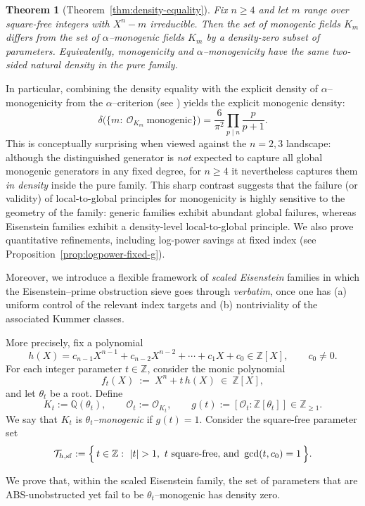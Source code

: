 \documentclass[11pt,letterpaper]{amsart}
\newcommand{\Z}{\mathbb{Z}}
\newcommand{\Q}{\mathbb{Q}}
\newcommand{\Ocal}{\mathcal{O}}
\theoremstyle{plain}
\newtheorem{theorem}{Theorem}[section]
\theoremstyle{definition}
\theoremstyle{remark}
\theoremstyle{plain}
\begin{document}
\begin{theorem}[Theorem~\ref{thm:density-equality}]
\label{thm:intro-density-equality}
Fix $n\ge4$ and let $m$ range over square-free integers with $X^n-m$ irreducible.
Then the set of monogenic fields $K_m$ differs from the set of $\alpha$--monogenic fields $K_m$ by a density-zero subset of parameters. Equivalently, monogenicity and $\alpha$--monogenicity have the same two-sided natural density in the pure family.
\end{theorem}

In particular, combining the density equality with the explicit density of $\alpha$--monogenicity from the $\alpha$--criterion (see \cite{NDN25}) yields the explicit monogenic density:
\[
\delta\bigl(\{m:\ \Ocal_{K_m}\ \text{monogenic}\}\bigr)
=
\frac{6}{\pi^2}\prod_{p\mid n}\frac{p}{p+1}.
\]
This is conceptually surprising when viewed against the $n=2,3$ landscape: although the distinguished
generator is \emph{not} expected to capture all global monogenic generators in any fixed degree,
for $n\ge4$ it nevertheless captures them \emph{in density} inside the pure family. This sharp contrast suggests that the failure (or validity) of local-to-global principles for monogenicity is highly sensitive to the geometry of the family: generic families exhibit abundant global failures, whereas Eisenstein families exhibit a density-level local-to-global principle. We also prove quantitative refinements, including log-power savings at fixed index (see Proposition~\ref{prop:logpower-fixed-g}).

Moreover, we introduce a flexible framework of \emph{scaled Eisenstein} families in which the Eisenstein--prime obstruction sieve goes through \emph{verbatim}, once one has (a) uniform control of the relevant index targets and (b) nontriviality of the associated Kummer classes.

More precisely, fix a polynomial
\[
h(X)=c_{n-1}X^{n-1}+c_{n-2}X^{n-2}+\cdots+c_1X+c_0\in\Z[X],
\qquad c_0\neq 0.
\]
For each integer parameter $t\in\Z$, consider the monic polynomial
\[
f_t(X)\ :=\ X^n+t\,h(X)\ \in\ \Z[X],
\]
and let $\theta_t$ be a root.  Define
\[
K_t:=\Q(\theta_t),\qquad \Ocal_t:=\Ocal_{K_t},\qquad g(t):=[\Ocal_t:\Z[\theta_t]]\in\Z_{\ge 1}.
\]
We say that $K_t$ is \emph{$\theta_t$--monogenic} if $g(t)=1$. Consider the square-free parameter set
\[
\mathcal{T}_{h,\mathrm{sf}}
:=\Bigl\{\,t\in\Z:\ |t|>1,\ t\ \text{square-free, and }\gcd(t,c_0)=1\,\Bigr\}.
\]

We prove that, within the scaled Eisenstein family, the set of parameters that are \textsc{ABS}-unobstructed yet fail to be $\theta_t$--monogenic has density zero.
\end{document}
